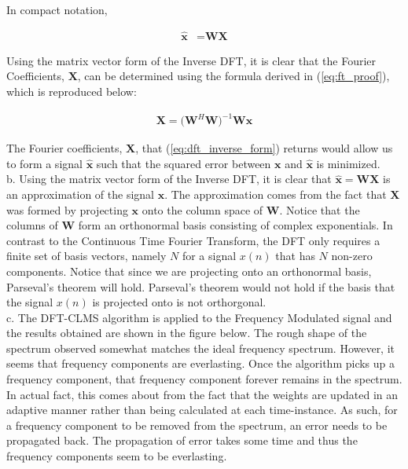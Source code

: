 \noindent{}In compact notation, 

\begin{align*}
\hat{\textbf{x}} &= \textbf{W}\textbf{X}
\end{align*}

\noindent{}Using the matrix vector form of the Inverse DFT, it is clear that the Fourier Coefficients, $\textbf{X}$, can be determined using the formula derived in (\ref{eq:ft_proof}), which is reproduced below:

\begin{align}
\textbf{X} = \big(\textbf{W}^H\textbf{W}\big)^{-1} \textbf{W}\textbf{x}\label{eq:dft_inverse_form}
\end{align}
 
\noindent{}The Fourier coefficients, $\textbf{X}$, that (\ref{eq:dft_inverse_form}) returns would allow us to form a signal $\hat{\textbf{x}}$ such that the squared error between $\textbf{x}$ and $\hat{\textbf{x}}$ is minimized.\\

\noindent{}b. Using the matrix vector form of the Inverse DFT, it is clear that $\hat{\textbf{x}} = \textbf{W}\textbf{X}$ is an approximation of the signal $\textbf{x}$. The approximation comes from the fact that $\textbf{X}$ was formed by projecting $\textbf{x}$ onto the column space of $\textbf{W}$. Notice that the columns of $\textbf{W}$ form an orthonormal basis consisting of complex exponentials. In contrast to the Continuous Time Fourier Transform, the DFT only requires a finite set of basis vectors, namely $N$ for a signal $x(n)$ that has $N$ non-zero components. Notice that since we are projecting onto an orthonormal basis, Parseval's theorem will hold. Parseval's theorem would not hold if the basis that the signal $x(n)$ is projected onto is not orthorgonal.\\

\noindent{}c. The DFT-CLMS algorithm is applied to the Frequency Modulated signal and the results obtained are shown in the figure below. The rough shape of the spectrum observed somewhat matches the ideal frequency spectrum. However, it seems that frequency components are everlasting. Once the algorithm picks up a frequency component, that frequency component forever remains in the spectrum. In actual fact, this comes about from the fact that the weights are updated in an adaptive manner rather than being calculated at each time-instance. As such, for a frequency component to be removed from the spectrum, an error needs to be propagated back. The propagation of error takes some time and thus the frequency components seem to be everlasting.
 
